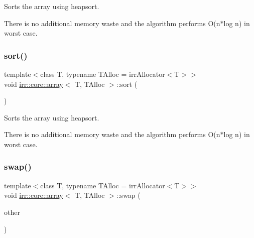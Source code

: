 Sorts the array using heapsort. 

There is no additional memory waste and the algorithm performs O(n$\ast$log n) in worst case. \mbox{\label{classirr_1_1core_1_1array_a870e52dd57dd67a9d59e5ca5f82bca94}} 
\subsubsection{\texorpdfstring{sort()}{sort()}\hspace{0.1cm}{\footnotesize\ttfamily [2/2]}}
{\footnotesize\ttfamily template$<$class T, typename T\+Alloc = irr\+Allocator$<$\+T$>$$>$ \\
void \hyperlink{classirr_1_1core_1_1array}{irr\+::core\+::array}$<$ T, T\+Alloc $>$\+::sort (\begin{DoxyParamCaption}{ }\end{DoxyParamCaption})\hspace{0.3cm}{\ttfamily [inline]}}



Sorts the array using heapsort. 

There is no additional memory waste and the algorithm performs O(n$\ast$log n) in worst case. \mbox{\label{classirr_1_1core_1_1array_a8857046f500a2990fc9930b204a3dbad}} 
\subsubsection{\texorpdfstring{swap()}{swap()}\hspace{0.1cm}{\footnotesize\ttfamily [1/2]}}
{\footnotesize\ttfamily template$<$class T, typename T\+Alloc = irr\+Allocator$<$\+T$>$$>$ \\
void \hyperlink{classirr_1_1core_1_1array}{irr\+::core\+::array}$<$ T, T\+Alloc $>$\+::swap (\begin{DoxyParamCaption}\item[{\hyperlink{classirr_1_1core_1_1array}{array}$<$ T, T\+Alloc $>$ \&}]{other }\end{DoxyParamCaption})\hspace{0.3cm}{\ttfamily [inline]}}



